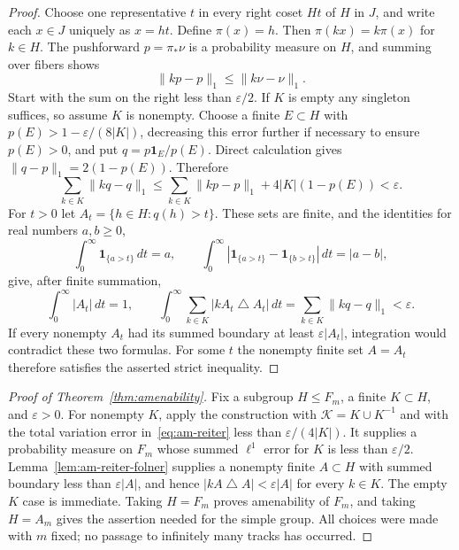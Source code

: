 \begin{proof}
Choose one representative $t$ in every right coset $Ht$ of $H$ in $J$,
and write each $x\in J$ uniquely as $x=h t$.  Define $\pi(x)=h$.
Then $\pi(kx)=k\pi(x)$ for $k\in H$.  The pushforward
$p=\pi_*\nu$ is a probability measure on $H$, and summing over fibers
shows
\[
 \|kp-p\|_1\le\|k\nu-\nu\|_1.
\]
Start with the sum on the right less than $\varepsilon/2$.  If $K$ is
empty any singleton suffices, so assume $K$ is nonempty.  Choose a finite
$E\subset H$ with $p(E)>1-\varepsilon/(8|K|)$, decreasing this error
further if necessary to ensure $p(E)>0$, and put
$q=p\mathbf1_E/p(E)$.  Direct calculation gives
$\|q-p\|_1=2(1-p(E))$.  Therefore
\[
 \sum_{k\in K}\|kq-q\|_1
 \le \sum_{k\in K}\|kp-p\|_1
       +4|K|(1-p(E))<\varepsilon.
\]
For $t>0$ let $A_t=\{h\in H:q(h)>t\}$.  These sets are finite, and the
identities for real numbers $a,b\ge0$,
\[
 \int_0^\infty\mathbf1_{\{a>t\}}\,dt=a,
 \qquad
 \int_0^\infty
 |\mathbf1_{\{a>t\}}-\mathbf1_{\{b>t\}}|\,dt=|a-b|,
\]
give, after finite summation,
\[
 \int_0^\infty |A_t|\,dt=1,
 \qquad
 \int_0^\infty\sum_{k\in K}|kA_t\mathbin\triangle A_t|\,dt
 =\sum_{k\in K}\|kq-q\|_1<\varepsilon.
\]
If every nonempty $A_t$ had its summed boundary at least
$\varepsilon|A_t|$, integration would contradict these two formulas.
For some $t$ the nonempty finite set $A=A_t$ therefore satisfies the
asserted strict inequality.
\end{proof}

\begin{proof}[Proof of Theorem~\ref{thm:amenability}]
Fix a subgroup $H\le F_m$, a finite $K\subset H$, and $\varepsilon>0$.
For nonempty $K$, apply the construction with $\mathcal K=K\cup K^{-1}$
and with the total variation error in~\eqref{eq:am-reiter} less than
$\varepsilon/(4|K|)$.  It supplies a probability measure on $F_m$ whose
summed $\ell^1$ error for $K$ is less than $\varepsilon/2$.
Lemma~\ref{lem:am-reiter-folner} supplies a nonempty finite $A\subset H$
with summed boundary less than $\varepsilon|A|$, and hence
$|kA\mathbin\triangle A|<\varepsilon|A|$ for every $k\in K$.
The empty $K$ case is immediate.  Taking $H=F_m$ proves amenability of
$F_m$, and taking $H=A_m$ gives the assertion needed for the simple group.
All choices were made with $m$ fixed; no passage to infinitely many tracks
has occurred.
\end{proof}
